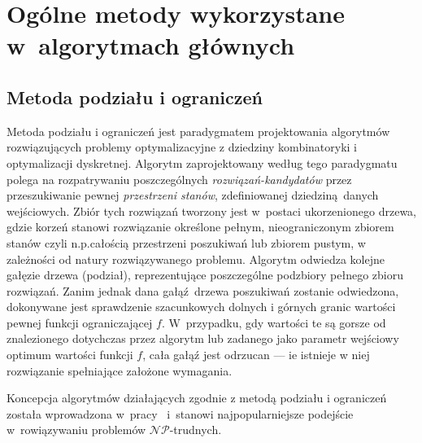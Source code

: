 \section{Ogólne metody wykorzystane w~algorytmach głównych}\label{s_methods}

\subsection{Metoda podziału i ograniczeń}\label{ss_branch_and_bound}
\par{
  Metoda podziału i ograniczeń jest paradygmatem projektowania algorytmów rozwiązujących problemy optymalizacyjne z dziedziny kombinatoryki i optymalizacji dyskretnej.
  Algorytm zaprojektowany według tego paradygmatu polega na rozpatrywaniu poszczególnych \emph{rozwiązań-kandydatów} przez przeszukiwanie pewnej \emph{przestrzeni stanów}, zdefiniowanej dziedziną danych wejściowych.
  Zbiór tych rozwiązań tworzony jest w~postaci ukorzenionego drzewa, gdzie korzeń stanowi rozwiązanie określone pełnym, nieograniczonym zbiorem stanów czyli n.p.całością przestrzeni poszukiwań lub zbiorem pustym, w zależności od natury rozwiązywanego problemu.
  Algorytm odwiedza kolejne gałęzie drzewa (podział), reprezentujące poszczególne
  podzbiory pełnego zbioru rozwiązań.
  Zanim jednak dana gałąź~drzewa poszukiwań zostanie odwiedzona, dokonywane jest sprawdzenie szacunkowych dolnych i górnych granic wartości pewnej funkcji ograniczającej $f$.
  W~przypadku, gdy wartości te są gorsze od znalezionego dotychczas przez algorytm lub zadanego jako parametr wejściowy optimum wartości funkcji $f$, cała gałąź jest odrzucan --- ie istnieje w niej rozwiązanie spełniające założone wymagania.
}
\par{
  Koncepcja algorytmów działających zgodnie z metodą podziału i ograniczeń została wprowadzona w~pracy~\cite{land60} i~stanowi najpopularniejsze podejście w~rowiązywaniu problemów $\mathcal{NP}$-trudnych.
}
